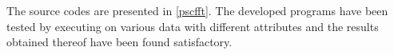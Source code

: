 \documentclass[a4paper,11pt]{report}
\begin{document}
The source codes are presented in \ref{pscfft}. The developed programs have been tested by executing on various data with different attributes and the results obtained thereof have been found satisfactory.








\end{document}
